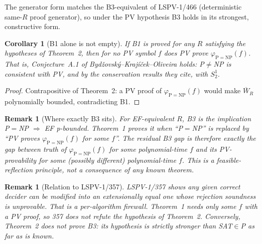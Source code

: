 \documentclass[11pt]{article}
\newtheorem{corollary}[theorem]{Corollary}
\newtheorem{remark}[theorem]{Remark}
\newcommand{\Wbar}{\overline W}
\begin{document}
The generator form matches the B3-equivalent of LSPV-1/466 (deterministic
same-$R$ proof generator), so under the PV hypothesis B3 holds in its strongest,
constructive form.

\begin{corollary}[B1 alone is not empty]
If B1 is proved for any $R$ satisfying the hypotheses of Theorem~2, then for no
PV symbol $f$ does PV prove $\varphi_{\mathrm{P=NP}}(f)$. That is,
Conjecture~A.1 of Bydžovský--Krajíček--Oliveira holds: P$\neq$NP is consistent
with PV, and by the conservation results they cite, with $S^1_2$.
\end{corollary}
\begin{proof}
Contrapositive of Theorem~2: a PV proof of $\varphi_{\mathrm{P=NP}}(f)$ would
make $\Wbar_R$ polynomially bounded, contradicting B1.
\end{proof}

\begin{remark}[Where exactly B3 sits]
For EF-equivalent $R$, B3 is the implication P$=$NP $\Rightarrow$ EF p-bounded.
Theorem~1 proves it when ``P$=$NP'' is replaced by ``PV proves
$\varphi_{\mathrm{P=NP}}(f)$ for some $f$''. The residual B3 gap is therefore
exactly the gap between \emph{truth} of $\varphi_{\mathrm{P=NP}}(f)$ for some
polynomial-time $f$ and its \emph{PV-provability} for some (possibly different)
polynomial-time $f$. This is a feasible-reflection principle, not a
consequence of any known theorem.
\end{remark}

\begin{remark}[Relation to LSPV-1/357]
LSPV-1/357 shows any \emph{given} correct decider can be modified into an
extensionally equal one whose rejection soundness is unprovable. That is a
per-algorithm firewall. Theorem~1 needs only \emph{some} $f$ with a PV proof,
so 357 does not refute the hypothesis of Theorem~2. Conversely, Theorem~2
does not prove B3: its hypothesis is strictly stronger than SAT$\in$P as far
as is known.
\end{remark}
\end{document}
